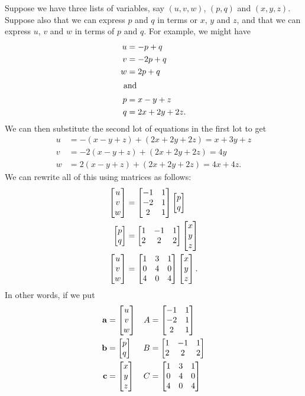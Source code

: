 \documentclass[a4paper]{book}
\theoremstyle{definition}
\begin{document}
Suppose we have three lists of variables, say $(u,v,w)$, $(p,q)$ and
$(x,y,z)$.  Suppose also that we can express $p$ and $q$ in terms or
$x$, $y$ and $z$, and that we can express $u$, $v$ and $w$ in terms of
$p$ and $q$.  For example, we might have
\begin{align*}
 u &= -p+q \\
 v &= -2p+q \\
 w &= 2p+q \\
 \intertext{ and }
 p &= x-y+z \\
 q &= 2x+2y+2z.
\end{align*}
We can then substitute the second lot of equations in the first lot to
get 
\begin{align*}
 u &= -(x-y+z)  + (2x+2y+2z) = x+3y+z \\
 v &= -2(x-y+z) + (2x+2y+2z) = 4y \\
 w &=  2(x-y+z) + (2x+2y+2z) = 4x + 4z.
\end{align*}
We can rewrite all of this using matrices as follows:
\begin{align*}
 \begin{bmatrix} u\\ v\\ w\end{bmatrix} &= \begin{bmatrix} -1&1 \\ -2&1 \\ 2&1\end{bmatrix} \begin{bmatrix} p\\ q\end{bmatrix} \\
 \begin{bmatrix} p \\ q\end{bmatrix} &= \begin{bmatrix} 1&-1&1 \\ 2&2&2 \end{bmatrix} \begin{bmatrix} x\\ y\\ z\end{bmatrix} \\
 \begin{bmatrix} u\\ v\\ w\end{bmatrix} &= \begin{bmatrix} 1&3&1 \\ 0&4&0 \\ 4&0&4 \end{bmatrix}
                       \begin{bmatrix} x\\ y\\ z\end{bmatrix}.
\end{align*}
In other words, if we put
\begin{align*}
 \mathbf{a} &= \begin{bmatrix} u\\ v\\ w\end{bmatrix} & A &= \begin{bmatrix} -1&1\\ -2&1\\ 2&1\end{bmatrix} \\
 \mathbf{b} &= \begin{bmatrix} p\\ q\end{bmatrix} & B &= \begin{bmatrix} 1&-1&1\\ 2&2&2\end{bmatrix} \\
 \mathbf{c} &= \begin{bmatrix} x\\ y\\ z\end{bmatrix} & C &= \begin{bmatrix} 1&3&1 \\ 0&4&0 \\ 4&0&4 \end{bmatrix} 
\end{align*}
\end{document}
